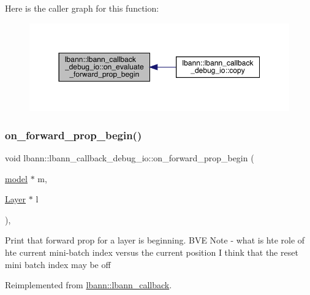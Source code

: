 Here is the caller graph for this function\+:\nopagebreak
\begin{figure}[H]
\begin{center}
\leavevmode
\includegraphics[width=350pt]{classlbann_1_1lbann__callback__debug__io_ac9b36fc36ab6faa9de44db026addf02a_icgraph}
\end{center}
\end{figure}
\mbox{\label{classlbann_1_1lbann__callback__debug__io_aa31ee265d40edff982ebf38054394927}} 
\subsubsection{\texorpdfstring{on\+\_\+forward\+\_\+prop\+\_\+begin()}{on\_forward\_prop\_begin()}}
{\footnotesize\ttfamily void lbann\+::lbann\+\_\+callback\+\_\+debug\+\_\+io\+::on\+\_\+forward\+\_\+prop\+\_\+begin (\begin{DoxyParamCaption}\item[{\hyperlink{classlbann_1_1model}{model} $\ast$}]{m,  }\item[{\hyperlink{classlbann_1_1Layer}{Layer} $\ast$}]{l }\end{DoxyParamCaption})\hspace{0.3cm}{\ttfamily [override]}, {\ttfamily [virtual]}}

Print that forward prop for a layer is beginning. B\+VE Note -\/ what is hte role of hte current mini-\/batch index versus the current position I think that the reset mini batch index may be off 

Reimplemented from \hyperlink{classlbann_1_1lbann__callback_ab96adb1d77180e00fdd668cd381323fd}{lbann\+::lbann\+\_\+callback}.



